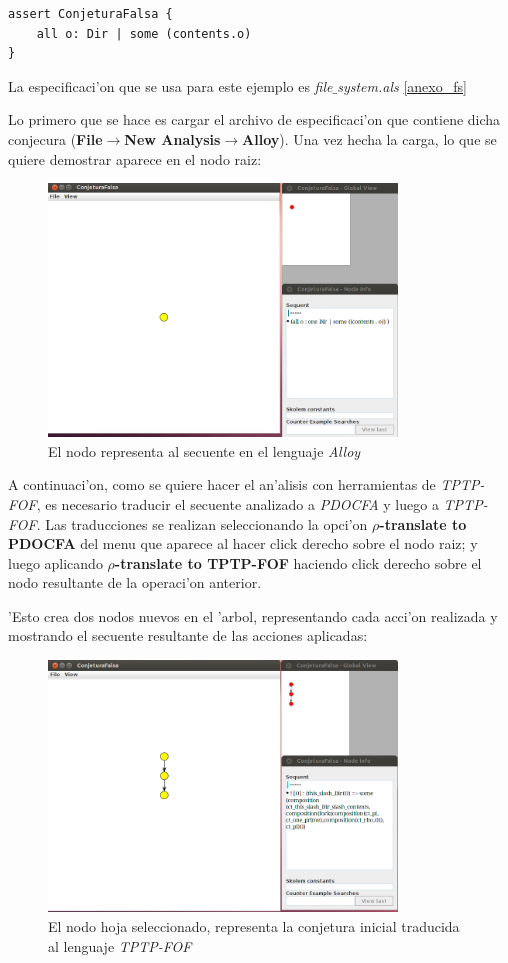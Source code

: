 \begin{verbatim}
assert ConjeturaFalsa {
    all o: Dir | some (contents.o)
}
\end{verbatim}

La especificaci'on que se usa para este ejemplo es \textit{file$\_$system.als} \ref{anexo_fs}

Lo primero que se hace es cargar el archivo de especificaci'on que contiene dicha conjecura (\textbf{File$\rightarrow$New Analysis$\rightarrow$Alloy}). Una vez hecha la carga, lo que se quiere demostrar aparece en el nodo raiz:

\begin{figure}[H]
	\includegraphics[width=350px]{img/conjetura_falsa_1.png}
	\centering
	\caption{El nodo representa al secuente en el lenguaje \textit{Alloy}}
\end{figure}

A continuaci'on, como se quiere hacer el an'alisis con herramientas de \textit{TPTP-FOF}, es necesario traducir el secuente analizado a \textit{PDOCFA} y luego a \textit{TPTP-FOF}. Las traducciones se realizan seleccionando la opci'on \textbf{$\rho$-translate to PDOCFA} del menu que aparece al hacer click derecho sobre el nodo raiz; y luego aplicando \textbf{$\rho$-translate to TPTP-FOF} haciendo click derecho sobre el nodo resultante de la operaci'on anterior. 

'Esto crea dos nodos nuevos en el 'arbol, representando cada acci'on realizada y mostrando el secuente resultante de las acciones aplicadas:

\begin{figure}[H]
	\includegraphics[width=350px]{img/conjetura_falsa_2.png}
	\centering
	\caption{El nodo hoja seleccionado, representa la conjetura inicial traducida al lenguaje \textit{TPTP-FOF}}
\end{figure}

